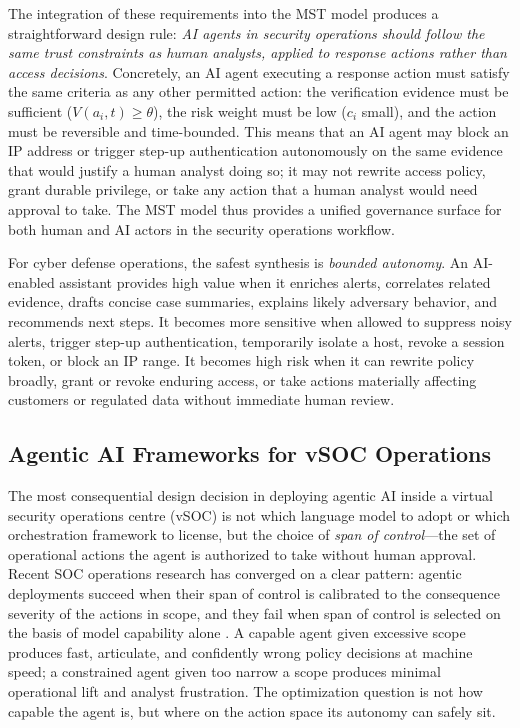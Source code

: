 \documentclass[acmlarge]{acmart}
\begin{document}
The integration of these requirements into the MST model produces a straightforward
design rule: \textit{AI agents in security operations should follow the same
trust constraints as human analysts, applied to response actions rather than access
decisions}. Concretely, an AI agent executing a response action must satisfy the
same criteria as any other permitted action: the verification evidence must be
sufficient ($V(a_i,t) \geq \theta$), the risk weight must be low ($c_i$ small),
and the action must be reversible and time-bounded. This means that an AI agent
may block an IP address or trigger step-up authentication autonomously on the
same evidence that would justify a human analyst doing so; it may not rewrite
access policy, grant durable privilege, or take any action that a human analyst
would need approval to take. The MST model thus provides a unified governance
surface for both human and AI actors in the security operations workflow.

For cyber defense operations, the safest synthesis is \textit{bounded autonomy}.
An AI-enabled assistant provides high value when it enriches alerts, correlates
related evidence, drafts concise case summaries, explains likely adversary behavior,
and recommends next steps. It becomes more sensitive when allowed to suppress noisy
alerts, trigger step-up authentication, temporarily isolate a host, revoke a session
token, or block an IP range. It becomes high risk when it can rewrite policy broadly,
grant or revoke enduring access, or take actions materially affecting customers or
regulated data without immediate human review.

\subsection{Agentic AI Frameworks for vSOC Operations}
\label{sec:autonomy_agentic}

The most consequential design decision in deploying agentic AI inside a virtual
security operations centre (vSOC) is not which language model to adopt or which
orchestration framework to license, but the choice of \textit{span of
control}---the set of operational actions the agent is authorized to take
without human approval. Recent SOC operations research has converged on a clear
pattern: agentic deployments succeed when their span of control is calibrated
to the consequence severity of the actions in scope, and they fail when span
of control is selected on the basis of model capability alone
\cite{ferrag2025,motlagh2024}. A capable agent given excessive scope produces
fast, articulate, and confidently wrong policy decisions at machine speed; a
constrained agent given too narrow a scope produces minimal operational lift
and analyst frustration. The optimization question is not how capable the
agent is, but where on the action space its autonomy can safely sit.
\end{document}
